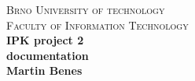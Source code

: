 \documentclass[10pt,a4paper,titlepage]{article}
\begin{document}
\begin{titlepage}

\begin{center}
\textsc{\LARGE Brno University of technology}\\[0.5cm]
\textsc{\large Faculty of Information Technology}\\[8cm]

{ \huge \bfseries IPK project 2}\\[0.3cm]
{ \Large \bfseries documentation}\\[0.5cm]
{ \bfseries Martin Benes}\\

\end{center}

\end{titlepage}
\newpage


\end{document}

